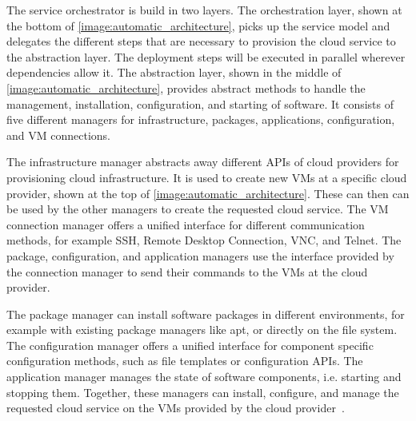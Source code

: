 The service orchestrator is build in two layers.
The orchestration layer, shown at the bottom of \autoref{image:automatic_architecture}, picks up the service model and delegates the different steps that are necessary to provision the cloud service to the abstraction layer.
The deployment steps will be executed in parallel wherever dependencies allow it.
The abstraction layer, shown in the middle of \autoref{image:automatic_architecture}, provides abstract methods to handle the management, installation, configuration, and starting of software.
It consists of five different managers for infrastructure, packages, applications, configuration, and VM connections.

The infrastructure manager abstracts away different APIs of cloud providers for provisioning cloud infrastructure.
It is used to create new VMs at a specific cloud provider, shown at the top of \autoref{image:automatic_architecture}.
These can then can be used by the other managers to create the requested cloud service.
The VM connection manager offers a unified interface for different communication methods, for example SSH, Remote Desktop Connection, VNC, and Telnet.
The package, configuration, and application managers use the interface provided by the connection manager to send their commands to the VMs at the cloud provider.

The package manager can install software packages in different environments, for example with existing package managers like apt, or directly on the file system.
The configuration manager offers a unified interface for component specific configuration methods, such as file templates or configuration APIs.
The application manager manages the state of software components, i.e. starting and stopping them.
Together, these managers can install, configure, and manage the requested cloud service on the VMs provided by the cloud provider~\autocite{provisioning:architecture}.
